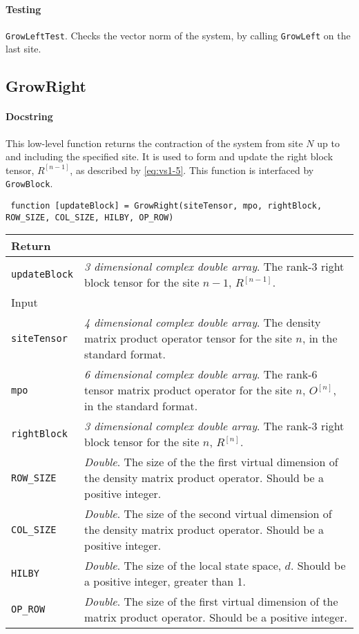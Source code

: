  \paragraph{Testing} \lstinline$GrowLeftTest$. Checks the vector norm of the system, by calling \lstinline$GrowLeft$ on the last site.
 
 \subsection{GrowRight}
 \paragraph{Docstring} This low-level function returns the contraction of the system from site \(N\) up to and including the specified site. It is used to form and update the right block tensor, \(R^{[n-1]}\), as described by \cref{eq:vs1-5}. This function is interfaced by \lstinline$GrowBlock$.
 \begin{lstlisting}
 function [updateBlock] = GrowRight(siteTensor, mpo, rightBlock, ROW_SIZE, COL_SIZE, HILBY, OP_ROW) \end{lstlisting}
 \begin{longtabu}{X[1,l]X[4,l]}
 \hline
 Return & \\ \hline
 \lstinline$updateBlock$ & \emph{3 dimensional complex double array}. The rank-3 right block tensor for the site \(n - 1\), \(R^{[n-1]}\). \\ \hline
 Input & \\ \hline
 \lstinline$siteTensor$ & \emph{4 dimensional complex double array}. The density matrix product operator tensor for the site \(n\), in the standard format. \\
 \lstinline$mpo$ & \emph{6 dimensional complex double array}. The rank-6 tensor matrix product operator for the site \(n\), \(O^{[n]}\), in the standard format. \\
 \lstinline$rightBlock$ & \emph{3 dimensional complex double array}. The rank-3 right block tensor for the site \(n\), \(R^{[n]}\). \\
 \lstinline$ROW_SIZE$ & \emph{Double}. The size of the the first virtual dimension of the density matrix product operator. Should be a positive integer. \\
 \lstinline$COL_SIZE$ & \emph{Double}. The size of the second virtual dimension of the density matrix product operator. Should be a positive integer. \\ 
 \lstinline$HILBY$ & \emph{Double}. The size of the local state space, \(d\). Should be a positive integer, greater than 1. \\
 \lstinline$OP_ROW$ & \emph{Double}. The size of the first virtual dimension of the matrix product operator. Should be a positive integer. \\
 \hline
 \end{longtabu}
